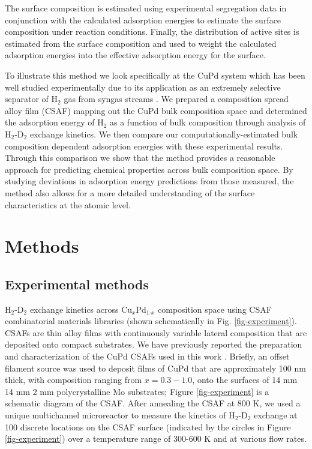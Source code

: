 \documentclass[12pt]{cmuthesis}
\begin{document}
The surface composition is estimated using experimental segregation data in conjunction with the calculated adsorption energies to estimate the surface composition under reaction conditions. Finally, the distribution of active sites is estimated from the surface composition and used to weight the calculated adsorption energies into the effective adsorption energy for the surface.

To illustrate this method we look specifically at the CuPd system which has been well studied experimentally due to its application as an extremely selective separator of H\(_{\text{2}}\) gas from syngas streams \cite{kamakoti-2005-predic-hydrog,obrien-2011-kinet-h,obrien-2012-h-d}. We prepared a composition spread alloy film (CSAF) \cite{fleutot-2012-appar-depos} mapping out the CuPd bulk composition space and determined the adsorption energy of H\(_{\text{2}}\) as a function of bulk composition through analysis of H\(_{\text{2}}\)-D\(_{\text{2}}\) exchange kinetics. We then compare our computationally-estimated bulk composition dependent adsorption energies with these experimental results. Through this comparison we show that the method provides a reasonable approach for predicting chemical properties across bulk composition space. By studying deviations in adsorption energy predictions from those measured, the method also allows for a more detailed understanding of the surface characteristics at the atomic level.

\section{Methods}
\label{sec:orgd7d73ea}
\subsection{Experimental methods}
\label{sec:orga31aa71}
H\(_{\text{2}}\)-D\(_{\text{2}}\) exchange kinetics across Cu\(_x\)Pd\(_{\text{1-}x}\) composition space using CSAF combinatorial materials libraries (shown schematically in Fig. \ref{fig-experiment}). CSAFs are thin alloy films with continuously variable lateral composition that are deposited onto compact substrates. We have previously reported the preparation and characterization of the CuPd CSAFs used in this work \cite{gumuslu-2015-correl-elect}. Briefly, an offset filament source \cite{priyadarshini-2011-high-throug,priyadarshini-2012-compac-tool} was used to deposit films of CuPd that are approximately 100 nm thick, with composition ranging from \(x = 0.3-1.0\), onto the surfaces of 14 mm \texttimes{} 14 mm \texttimes{} 2 mm polycrystalline Mo substrates; Figure \ref{fig-experiment} is a schematic diagram of the CSAF. After annealing the CSAF at 800 K, we used a unique multichannel microreactor \cite{kondratyuk-2013-micror-array} to measure the kinetics of H\(_{\text{2}}\)-D\(_{\text{2}}\) exchange at 100 discrete locations on the CSAF surface (indicated by the circles in Figure \ref{fig-experiment}) over a temperature range of 300-600 K and at various flow rates.
\end{document}
